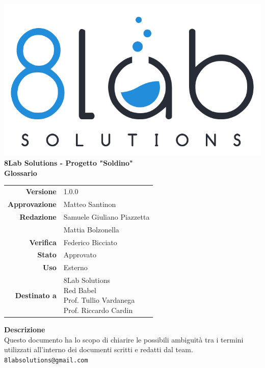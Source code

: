 \thispagestyle{empty}
\begin{titlepage}
	\begin{center}
		\includegraphics[scale = 0.3]{res/images/logo8_crop.png}\\
		\large \textbf{8Lab Solutions - Progetto "Soldino"} \\
		\vfill
		\Huge \textbf{Glossario}
		\vspace*{\fill} 
        \vfill
        \large
        \begin{tabular}{r|l}
                        \textbf{Versione} & 1.0.0\\
                        \textbf{Approvazione} &Matteo Santinon\\
                        \textbf{Redazione} & Samuele Giuliano Piazzetta\\
                        & Mattia Bolzonella \\
                        \textbf{Verifica} &Federico Bicciato\\
                        \textbf{Stato} & Approvato\\
                        \textbf{Uso} & Esterno\\
                        \textbf{Destinato a} & \parbox[t]{5cm}{8Lab Solutions\\ Red Babel\\Prof. Tullio Vardanega\\Prof. Riccardo Cardin}
                \end{tabular}
                \vfill
                \normalsize
                \textbf{Descrizione}\\
                Questo documento ha lo scopo di chiarire le possibili ambiguità tra i termini utilizzati all’interno dei documenti scritti e redatti dal team.\\
                \vfill
                \small
                \texttt{8labsolutions@gmail.com}
	\end{center}
\end{titlepage}